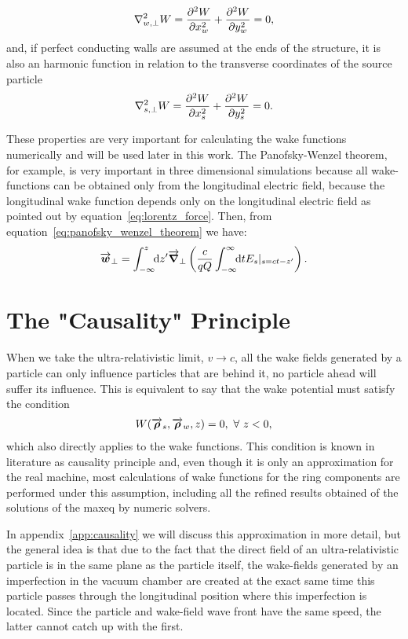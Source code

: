     \begin{align}\label{eq:potential_harmonic}
  	  	\nabla^2_{w,\perp} W = \derpar[2]{W}{x_w} + \derpar[2]{W}{y_w} = 0,
    \end{align}
    and, if perfect conducting walls are assumed at the ends of the structure, it is also an harmonic function in relation to the transverse coordinates of the source particle~\cite{Zagorodnov2015}
    \begin{align}\label{eq:potential_harmonic_source}
  	  	\nabla^2_{s,\perp} W = \derpar[2]{W}{x_s} + \derpar[2]{W}{y_s} = 0.
    \end{align}

    These properties are very important for calculating the wake functions numerically and will be used later in this work. The Panofsky-Wenzel theorem, for example, is very important in three dimensional simulations because all wake-functions can be obtained only from the longitudinal electric field, because the longitudinal wake function depends only on the longitudinal electric field as pointed out by equation~\eqref{eq:lorentz_force}. Then, from equation~\eqref{eq:panofsky_wenzel_theorem} we have:
    \begin{align}
  	  	\vect{w}_\perp = \defint{z'}{\vect{\nabla}_\perp\left(\frac{c}{qQ}\infint{t}{E_s|_{s=ct-z'}}\right)}{-\infty}{z}.
    \end{align}

\section{The "Causality" Principle}

    When we take the ultra-relativistic limit, $v \to c$, all the wake fields generated by a particle can only influence particles that are behind it, no particle ahead will suffer its influence. This is equivalent to say that the wake potential must satisfy the condition
    \begin{align}
  	  	W(\vect{\rho}_s, \vect{\rho}_w, z) = 0, \,\,  \forall\,\, z < 0,
    \end{align}
    which also directly applies to the wake functions. This condition is known in literature as causality principle and, even though it is only an approximation for the real machine, most calculations of wake functions for the ring components are performed under this assumption, including all the refined results obtained of the solutions of the \gls{maxeq} by numeric solvers.

    In appendix~\ref{app:causality} we will discuss this approximation in more detail, but the general idea is that due to the fact that the direct field of an ultra-relativistic particle is in the same plane as the particle itself, the wake-fields generated by an imperfection in the vacuum chamber are created at the exact same time this particle passes through the longitudinal position where this imperfection is located. Since the particle and wake-field wave front have the same speed, the latter cannot catch up with the first.

